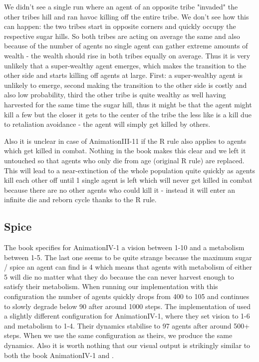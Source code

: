 We didn't see a single run where an agent of an opposite tribe "invaded" the other tribes hill and ran havoc killing off the entire tribe. We don't see how this can happen: the two tribes start in opposite corners and quickly occupy the respective sugar hills. So both tribes are acting on average the same and also because of the number of agents no single agent can gather extreme amounts of wealth - the wealth should rise in both tribes equally on average. Thus it is very unlikely that a super-wealthy agent emerges, which makes the transition to the other side and starts killing off agents at large. First: a super-wealthy agent is unlikely to emerge, second making the transition to the other side is costly and also low probability, third the other tribe is quite wealthy as well having harvested for the same time the sugar hill, thus it might be that the agent might kill a few but the closer it gets to the center of the tribe the less like is a kill due to retaliation avoidance - the agent will simply get killed by others.

Also it is unclear in case of AnimationIII-11 if the R rule also applies to agents which get killed in combat. Nothing in the book makes this clear and we left it untouched so that agents who only die from age (original R rule) are replaced. This will lead to a near-extinction of the whole population quite quickly as agents kill each other off until 1 single agent is left which will never get killed in combat because there are no other agents who could kill it - instead it will enter an infinite die and  reborn cycle thanks to the R rule.

\subsection{Spice}
The book specifies for AnimationIV-1 a vision between 1-10 and a metabolism between 1-5. The last one seems to be quite strange because the maximum sugar / spice an agent can find is 4 which means that agents with metabolism of either 5 will die no matter what they do because the can never harvest enough to satisfy their metabolism. When running our implementation with this configuration the number of agents quickly drops from 400 to 105 and continues to slowly degrade below 90 after around 1000 steps.
The implementation of \cite{weaver_replicating_2009} used a slightly different configuration for AnimationIV-1, where they set vision to 1-6 and metabolism to 1-4. Their dynamics stabilise to 97 agents after around 500+ steps. When we use the same configuration as theirs, we produce the same dynamics.
Also it is worth nothing that our visual output is strikingly similar to both the book AnimationIV-1 and \cite{weaver_replicating_2009}.

